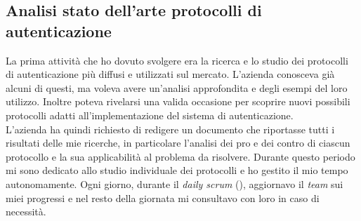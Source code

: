 \subsection{Analisi stato dell'arte protocolli di autenticazione}\label{sec:att_analisi}
    La prima attività che ho dovuto svolgere era la ricerca e lo studio dei protocolli di autenticazione più diffusi e utilizzati sul mercato. L'azienda conosceva già alcuni di questi, ma voleva avere un'analisi approfondita e degli esempi del loro utilizzo. Inoltre poteva rivelarsi una valida occasione per scoprire nuovi possibili protocolli adatti all'implementazione del sistema di autenticazione. \\
    L'azienda ha quindi richiesto di redigere un documento che riportasse tutti i risultati delle mie ricerche, in particolare l'analisi dei pro e dei contro di ciascun protocollo e la sua applicabilità al problema da risolvere.
    Durante questo periodo mi sono dedicato allo studio individuale dei protocolli e ho gestito il mio tempo autonomamente. Ogni giorno, durante il \textit{daily scrum} (), aggiornavo il \textit{team} sui miei progressi e nel resto della giornata mi consultavo con loro in caso di necessità.

